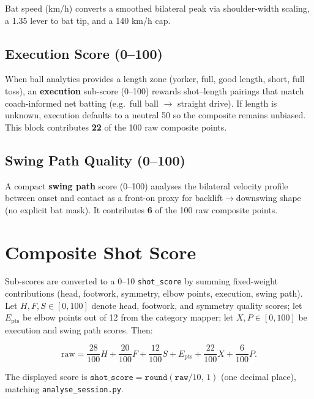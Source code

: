 \begin{justify}
\par Bat speed (km/h) converts a smoothed bilateral peak via shoulder-width scaling, a 1.35 lever to bat tip, and a 140 km/h cap.

\subsection{Execution Score (0--100)}

\par When ball analytics provides a length zone (yorker, full, good length, short, full toss), an \textbf{execution} sub-score (0--100) rewards shot--length pairings that match coach-informed net batting (e.g.\ full ball $\rightarrow$ straight drive). If length is unknown, execution defaults to a neutral 50 so the composite remains unbiased. This block contributes \textbf{22} of the 100 raw composite points.

\subsection{Swing Path Quality (0--100)}

\par A compact \textbf{swing path} score (0--100) analyses the bilateral velocity profile between onset and contact as a front-on proxy for backlift$\rightarrow$downswing shape (no explicit bat mask). It contributes \textbf{6} of the 100 raw composite points.

\section{Composite Shot Score}

\par Sub-scores are converted to a 0--10 \texttt{shot\_score} by summing fixed-weight contributions (head, footwork, symmetry, elbow points, execution, swing path). Let $H,F,S \in [0,100]$ denote head, footwork, and symmetry quality scores; let $E_{\mathrm{pts}}$ be elbow points out of 12 from the category mapper; let $X,P \in [0,100]$ be execution and swing path scores. Then:

\begin{equation}
    \text{raw} =
    \frac{28}{100} H +
    \frac{20}{100} F +
    \frac{12}{100} S +
    E_{\mathrm{pts}} +
    \frac{22}{100} X +
    \frac{6}{100} P.
\end{equation}

\par The displayed score is $\texttt{shot\_score} = \texttt{round}(\texttt{raw}/10,\, 1)$ (one decimal place), matching \texttt{analyse\_session.py}.


\end{justify}

